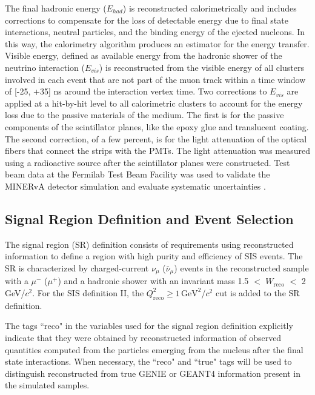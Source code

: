 \documentclass[aps, prd, twocolumn, showpacs, superscriptaddress, floatfix]{revtex4-2}
\begin{document}
The final hadronic energy ($E_{had}$) is reconstructed calorimetrically and includes corrections to compensate for the loss of detectable energy due to final state interactions, neutral particles, and the binding energy of the ejected nucleons. In this way, the calorimetry algorithm produces an estimator for the energy transfer. Visible energy, defined as available energy from the hadronic shower of the neutrino interaction ($E_{vis}$) is reconstructed from the visible energy of all clusters involved in each event that are not part of the muon track within a time window of [-25, +35] ns around the interaction vertex time. Two corrections to $E_{vis}$ are applied at a hit-by-hit level to all calorimetric clusters to account for the energy loss due to the passive materials of the medium. The first is for the passive components of the scintillator planes, like the epoxy glue and translucent coating. The second correction, of a few percent, is for the light attenuation of the optical fibers that connect the strips with the PMTs. The light attenuation was measured using a radioactive source after the scintillator planes were constructed. Test beam data at the Fermilab Test Beam Facility was used to validate the MINERvA detector simulation and evaluate systematic uncertainties \cite{Aliaga:2015aqe}.

\subsection{Signal Region Definition and Event Selection}
\label{Sec:SRdefinition}

The signal region (SR) definition consists of requirements using reconstructed information to define a region with high purity and efficiency of SIS events. The SR is characterized by charged-current $\nu_\mu$ ($\bar{\nu}_\mu$) events in the reconstructed sample with a $\mu^-$ ($\mu^+$) and a hadronic shower with an invariant mass 1.5 $<$ $W_\mathrm{reco}$ $<$ 2 GeV/$c^2$. For the SIS definition II, the $Q_\mathrm{reco}^2 \geq 1\,\mathrm{GeV}^2$/$c^2$ cut is added to the SR definition. 

The tags ``reco" in the variables used for the signal region definition explicitly indicate that they were obtained by reconstructed information of observed quantities computed from the particles emerging from the nucleus after the final state interactions. When necessary, the ``reco" and ``true" tags will be used to distinguish reconstructed from true GENIE or GEANT4 information present in the simulated samples. 
\end{document}
